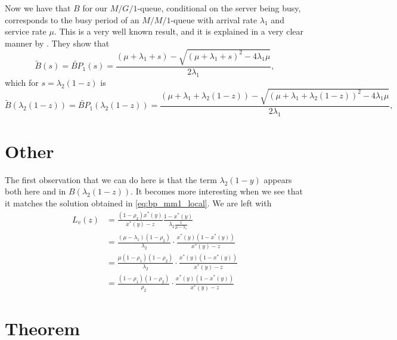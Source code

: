 Now we have that $B$ for our $M/G/1$-queue, conditional on the server being busy, corresponds to the busy period of an $M/M/1$-queue with arrival rate $\lambda_1$ and service rate $\mu$. This is a very well known result, and it is explained in a very clear manner by \cite{adan2002queueing}. They show that
\begin{equation}
   \widetilde{B}(s) = \widetilde{BP}_1(s) = \frac{
   ( \mu + \lambda_1 + s) - \sqrt{( \mu + \lambda_1 + s)^2-4\lambda_1 \mu}
    }{2\lambda_1},
\end{equation}
which for $s= \lambda_2 (1-z)$ is
\begin{equation}
    \widetilde{B}(\lambda_2 (1-z)) = \widetilde{BP}_1(\lambda_2 (1-z)) = \frac{
   ( \mu + \lambda_1 + \lambda_2 (1-z)) - \sqrt{( \mu + \lambda_1 + \lambda_2 (1-z))^2-4\lambda_1 \mu}
    }{2\lambda_1}, \label{eq:bp_mm1_local}
\end{equation}




\section{Other}
The first observation that we can do here is that the term $\lambda_2(1-y)$ appears both here and in $B(\lambda_2(1-z))$. It becomes more interesting when we see that it matches the solution obtained in \eqref{eq:bp_mm1_local}.
We are left with
\begin{align*}
    L_v(z) 
    &= \frac{(1-\rho_2)x^*(y) }{x^*(y)  - z}
    \frac{1 - x^*(y) }{\lambda_2\frac{1}{\mu - \lambda_1}} \\
    &= \frac{(\mu - \lambda_1)(1 - \rho_2)}{ \lambda_2} \cdot \frac{x^*(y)(1 - x^*(y))}{x^*(y)-z} \\
    &= \frac{\mu(1-\rho_1)(1-\rho_2)}{\lambda_2} \cdot \frac{x^*(y)(1 - x^*(y))}{x^*(y)-z} \\
    &= \frac{(1-\rho_1)(1-\rho_2)}{\rho_2} \cdot \frac{x^*(y)(1 - x^*(y))}{x^*(y)-z}
\end{align*}

\section{Theorem}

